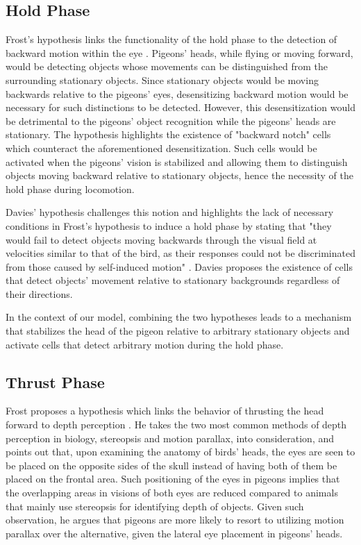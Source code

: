 \subsection{Hold Phase}
  Frost's hypothesis links the functionality of the hold phase to the detection of backward motion within the eye \cite{frost1978optokinetic}. Pigeons' heads, while flying or moving forward, would be detecting objects whose movements can be distinguished from the surrounding stationary objects. Since stationary objects would be moving backwards relative to the pigeons' eyes, desensitizing backward motion would be necessary for such distinctions to be detected. However, this desensitization would be detrimental to the pigeons' object recognition while the pigeons' heads are stationary. The hypothesis highlights the existence of "backward notch" cells which counteract the aforementioned desensitization. Such cells would be activated when the pigeons' vision is stabilized and allowing them to distinguish objects moving backward relative to stationary objects, hence the necessity of the hold phase during locomotion.

  Davies' hypothesis challenges this notion and highlights the lack of necessary conditions in Frost's hypothesis to induce a hold phase by stating that "they would fail to detect objects moving backwards through the visual field at velocities similar to that of the bird, as their responses could not be discriminated from those caused by self-induced motion" \cite{davies1988head}. Davies proposes the existence of cells that detect objects' movement relative to stationary backgrounds regardless of their directions.

  In the context of our model, combining the two hypotheses leads to a mechanism that stabilizes the head of the pigeon relative to arbitrary stationary objects and activate cells that detect arbitrary motion during the hold phase.

\subsection{Thrust Phase}
    Frost proposes a hypothesis which links the behavior of thrusting the head forward to depth perception \cite{frost1978optokinetic}. He takes the two most common methods of depth perception in biology, stereopsis and motion parallax, into consideration, and points out that, upon examining the anatomy of birds' heads, the eyes are seen to be placed on the opposite sides of the skull instead of having both of them be placed on the frontal area. Such positioning of the eyes in pigeons implies that the overlapping areas in visions of both eyes are reduced compared to animals that mainly use stereopsis for identifying depth of objects. Given such observation, he argues that pigeons are more likely to resort to utilizing motion parallax over the alternative, given the lateral eye placement in pigeons' heads.

